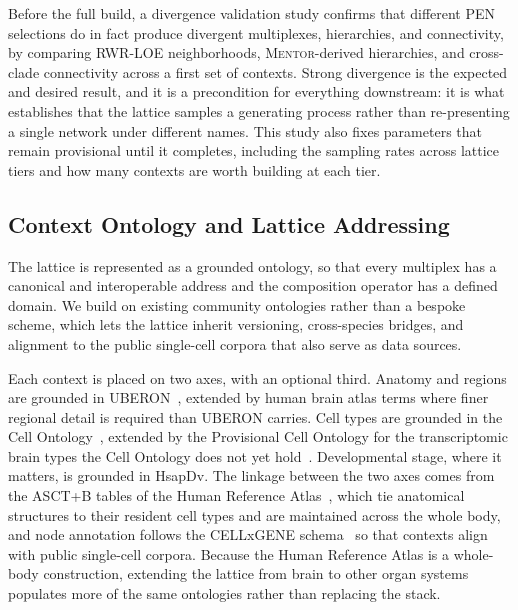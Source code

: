 \documentclass[thesis,letterpaper,12pt]{utthesis}
\begin{document}
Before the full build, a divergence validation study confirms that different PEN selections do in fact produce divergent multiplexes, hierarchies, and connectivity, by comparing RWR-LOE neighborhoods, \textsc{Mentor}-derived hierarchies, and cross-clade connectivity across a first set of contexts. Strong divergence is the expected and desired result, and it is a precondition for everything downstream: it is what establishes that the lattice samples a generating process rather than re-presenting a single network under different names. This study also fixes parameters that remain provisional until it completes, including the sampling rates across lattice tiers and how many contexts are worth building at each tier.

\subsection{Context Ontology and Lattice Addressing}\label{sec:ontology}
The lattice is represented as a grounded ontology, so that every multiplex has a canonical and interoperable address and the composition operator has a defined domain. We build on existing community ontologies rather than a bespoke scheme, which lets the lattice inherit versioning, cross-species bridges, and alignment to the public single-cell corpora that also serve as data sources.

Each context is placed on two axes, with an optional third. Anatomy and regions are grounded in UBERON~\cite{uberon}, extended by human brain atlas terms where finer regional detail is required than UBERON carries. Cell types are grounded in the Cell Ontology~\cite{cellontology}, extended by the Provisional Cell Ontology for the transcriptomic brain types the Cell Ontology does not yet hold~\cite{pcl}. Developmental stage, where it matters, is grounded in HsapDv. The linkage between the two axes comes from the ASCT+B tables of the Human Reference Atlas~\cite{asctb}, which tie anatomical structures to their resident cell types and are maintained across the whole body, and node annotation follows the CELLxGENE schema~\cite{cellxgene} so that contexts align with public single-cell corpora. Because the Human Reference Atlas is a whole-body construction, extending the lattice from brain to other organ systems populates more of the same ontologies rather than replacing the stack.
\end{document}
